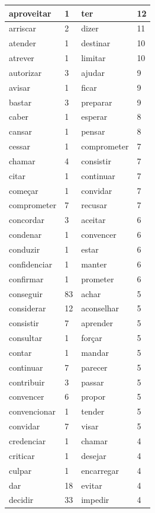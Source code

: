 \documentclass[output=paper,colorlinks,citecolor=brown]{langscibook}
\begin{document}
\begin{longtable}{ p{3cm} | p{1cm} | p{3cm} | p{1cm} }
			aproveitar & 1 & ter & 12\\\hline
			arriscar & 2 & dizer & 11\\\hline
			atender & 1 & destinar & 10\\\hline
			atrever & 1 & limitar & 10\\\hline
			autorizar & 3 & ajudar & 9\\\hline
			avisar & 1 & ficar & 9\\\hline
			bastar & 3 & preparar & 9\\\hline
			caber & 1 & esperar & 8\\\hline
			cansar & 1 & pensar & 8\\\hline
			cessar & 1 & comprometer & 7\\\hline
			chamar & 4 & consistir & 7\\\hline
			citar & 1 & continuar & 7\\\hline
			começar & 1 & convidar & 7\\\hline
			comprometer & 7 & recusar & 7\\\hline
			concordar & 3 & aceitar & 6\\\hline
			condenar & 1 & convencer & 6\\\hline
			conduzir & 1 & estar & 6\\\hline
			confidenciar & 1 & manter & 6\\\hline
			confirmar & 1 & prometer & 6\\\hline
			conseguir & 83 & achar & 5\\\hline
			considerar & 12 & aconselhar & 5\\\hline
			consistir & 7 & aprender & 5\\\hline
			consultar & 1 & forçar & 5\\\hline
			contar & 1 & mandar & 5\\\hline
			continuar & 7 & parecer & 5\\\hline
			contribuir & 3 & passar & 5\\\hline
			convencer & 6 & propor & 5\\\hline
			convencionar & 1 & tender & 5\\\hline
			convidar & 7 & visar & 5\\\hline
			credenciar & 1 & chamar & 4\\\hline
			criticar & 1 & desejar & 4\\\hline
			culpar & 1 & encarregar & 4\\\hline
			dar & 18 & evitar & 4\\\hline
			decidir & 33 & impedir & 4\\\hline

\end{longtable}
\end{document}
